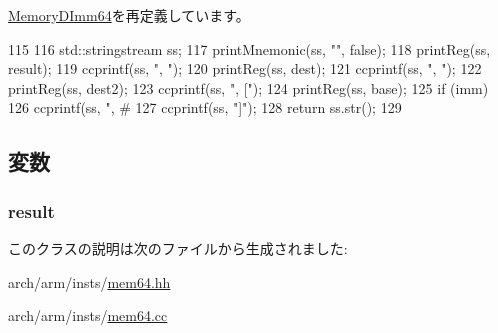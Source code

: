 \hyperlink{classArmISA_1_1MemoryDImm64_a95d323a22a5f07e14d6b4c9385a91896}{MemoryDImm64}を再定義しています。


\begin{DoxyCode}
115 {
116     std::stringstream ss;
117     printMnemonic(ss, "", false);
118     printReg(ss, result);
119     ccprintf(ss, ", ");
120     printReg(ss, dest);
121     ccprintf(ss, ", ");
122     printReg(ss, dest2);
123     ccprintf(ss, ", [");
124     printReg(ss, base);
125     if (imm)
126         ccprintf(ss, ", #%
127     ccprintf(ss, "]");
128     return ss.str();
129 }
\end{DoxyCode}


\subsection{変数}
\hypertarget{classArmISA_1_1MemoryDImmEx64_a43f8ecc8130e5285e0ae2134151d6d6a}{
\subsubsection[{result}]{ {\bf result}}}
\label{classArmISA_1_1MemoryDImmEx64_a43f8ecc8130e5285e0ae2134151d6d6a}


このクラスの説明は次のファイルから生成されました:\begin{DoxyCompactItemize}
\item 
arch/arm/insts/\hyperlink{mem64_8hh}{mem64.hh}\item 
arch/arm/insts/\hyperlink{mem64_8cc}{mem64.cc}\end{DoxyCompactItemize}
